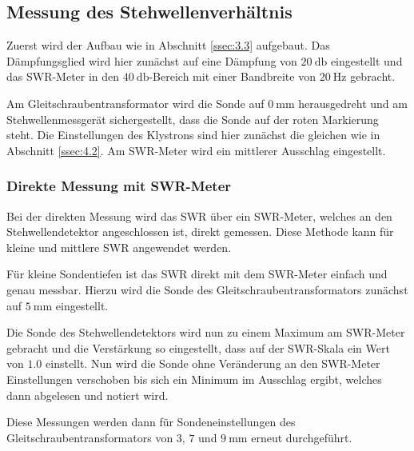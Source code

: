         \subsection{Messung des Stehwellenverhältnis \label{ssec:4.3}}
            Zuerst wird der Aufbau wie in Abschnitt \ref{ssec:3.3} aufgebaut.
            Das Dämpfungsglied wird hier zunächst auf eine Dämpfung von $\SI{20}{\decibel}$ eingestellt und das SWR-Meter in den $\SI{40}{\decibel}$-Bereich mit einer Bandbreite von $\SI{20}{\hertz}$ gebracht.
            
            Am Gleitschraubentransformator wird die Sonde auf $\SI{0}{\milli\meter}$ herausgedreht und am Stehwellenmessgerät sichergestellt, dass die Sonde auf der roten Markierung steht.
            Die Einstellungen des Klystrons sind hier zunächst die gleichen wie in Abschnitt \ref{ssec:4.2}.
            Am SWR-Meter wird ein mittlerer Ausschlag eingestellt.
            \subsubsection{Direkte Messung mit SWR-Meter}
                Bei der direkten Messung wird das SWR
                über ein SWR-Meter, welches an den Stehwellendetektor angeschlossen ist, direkt gemessen.
                Diese Methode kann für kleine und mittlere SWR angewendet werden.

                Für kleine Sondentiefen ist das SWR direkt mit dem SWR-Meter einfach und genau messbar.
                Hierzu wird die Sonde des Gleitschraubentransformators zunächst auf $\SI{5}{\milli\meter}$ eingestellt.
                
                Die Sonde des Stehwellendetektors wird nun zu einem Maximum am SWR-Meter gebracht und die Verstärkung so eingestellt, dass auf der SWR-Skala ein Wert von $\num{1.0}$ einstellt.
                Nun wird die Sonde ohne Veränderung an den SWR-Meter Einstellungen verschoben bis sich ein Minimum im Ausschlag ergibt, welches dann abgelesen und notiert wird.
                
                Diese Messungen werden dann für Sondeneinstellungen des Gleitschraubentransformators von $3$, $7$ und $\SI{9}{\milli\meter}$ erneut durchgeführt.
                

